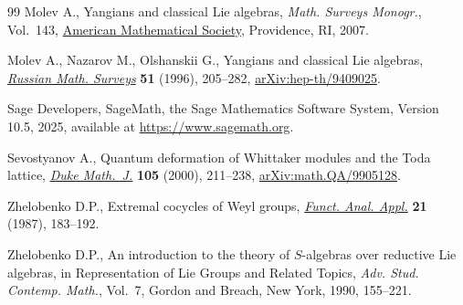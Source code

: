 \documentclass[10pt,a4paper]{amsart}
\numberwithin{equation}{section}
\begin{document}
\begin{thebibliography}{99}
Molev A., Yangians and classical {L}ie algebras, \textit{Math. Surveys
 Monogr.}, Vol.~143, \href{https://doi.org/10.1090/surv/143}{American Mathematical Society}, Providence, RI, 2007.

Molev A., Nazarov M., Olshanskii G., Yangians and classical {L}ie algebras,
  \href{https://doi.org/10.1070/RM1996v051n02ABEH002772}{\textit{Russian Math. Surveys}} \textbf{51} (1996), 205--282,
 \href{https://arxiv.org/abs/hep-th/9409025}{arXiv:hep-th/9409025}.

Sage Developers, {S}ageMath, the {S}age {M}athematics {S}oftware {S}ystem,
 {V}ersion 10.5, 2025, available at \url{https://www.sagemath.org}.

Sevostyanov A., Quantum deformation of {W}hittaker modules and the {T}oda
 lattice, \href{https://doi.org/10.1215/S0012-7094-00-10522-4}{\textit{Duke Math.~J.}} \textbf{105} (2000), 211--238,
 \href{https://arxiv.org/abs/math.QA/9905128}{arXiv:math.QA/9905128}.

Zhelobenko D.P., Extremal cocycles of {W}eyl groups, \href{https://doi.org/10.1007/BF02577133}{\textit{Funct. Anal.
 Appl.}} \textbf{21} (1987), 183--192.

Zhelobenko D.P., An introduction to the theory of {$S$}-algebras over reductive
 {L}ie algebras, in Representation of {L}ie {G}roups and {R}elated {T}opics,
 \textit{Adv. Stud. Contemp. Math.}, Vol.~7, Gordon and Breach, New York,
 1990, 155--221.

\end{thebibliography}
\end{document}
